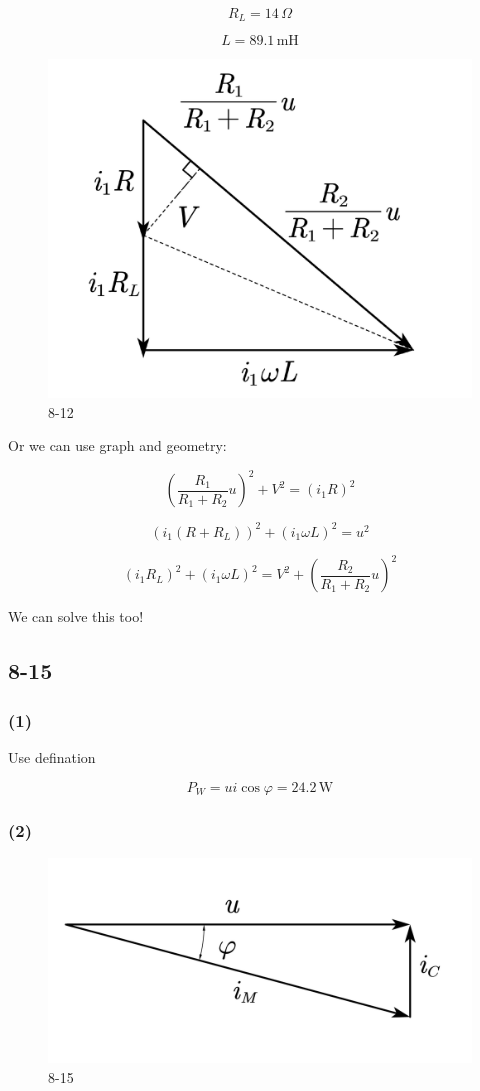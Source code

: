 \documentclass[a4paper,11pt]{amsart}
\theoremstyle{definition}
\begin{document}
	$$
	R_L=14\,\Omega
	$$
	
	$$
	L=89.1\,\mathrm{mH}
	$$
	
	\begin{figure}[h]
		\centering
		\includegraphics[width=0.7\linewidth]{8-12-12}
		\caption*{8-12}
		\label{fig:8-12-12}
	\end{figure}
	
	Or we can use graph and geometry:
	
	$$
	\left( \frac{R_1}{R_1+R_2}u \right) ^2+V^2=\left( i_1R \right) ^2
	$$
	
	$$
	\left( i_1\left( R+R_L \right) \right) ^2+\left( i_1\omega L \right) ^2=u^2
	$$
	
	$$
	\left( i_1R_L \right) ^2+\left( i_1\omega L \right) ^2=V^2+\left( \frac{R_2}{R_1+R_2}u \right) ^2
	$$
	
	We can solve this too!
	
	\subsection*{8-15}	
	
	\subsubsection*{(1)}
	
	Use defination
	
	$$
	P_W=ui\cos \varphi =24.2\,\mathrm{W}
	$$
	
	\subsubsection*{(2)}
	
	\begin{figure}
		\centering
		\includegraphics[width=0.7\linewidth]{8-15}
		\caption*{8-15}
		\label{fig:8-15}
	\end{figure}
	
\end{document}

